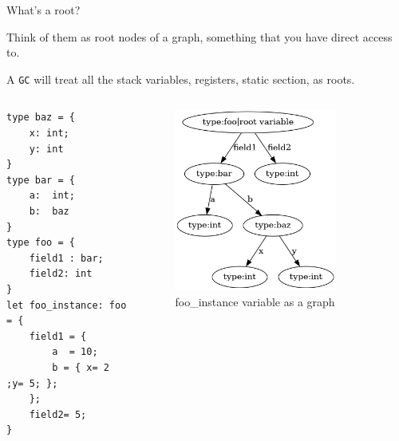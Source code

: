 \documentclass[
  10pt,
  ignorenonframetext,
]{beamer}
\begin{document}
\begin{frame}[fragile]{What's a root?}
\protect\hypertarget{whats-a-root}{}
\pause

Think of them as root nodes of a graph, something
that you have direct access to.

\pause

A \texttt{GC} will treat all the stack variables,
registers, static section, as roots.

\text

\begin{columns}[T]
\begin{column}{0.48\textwidth}
\pause

\scriptsize

\begin{verbatim}
type baz = {
    x: int;
    y: int
}
type bar = {
    a:  int;
    b:  baz
}
type foo = {
    field1 : bar;
    field2: int
}
let foo_instance: foo = {
    field1 = {
        a  = 10;
        b = { x= 2 ;y= 5; };
    };
    field2= 5;
}
\end{verbatim}

\normalsize
\end{column}

\begin{column}{0.48\textwidth}
\pause

\begin{figure}
\centering
\includegraphics[width=0.8\textwidth,height=\textheight]{images/object_graph.png}
\caption{foo\_instance variable as a graph}
\end{figure}
\end{column}
\end{columns}
\end{frame}
\end{document}
